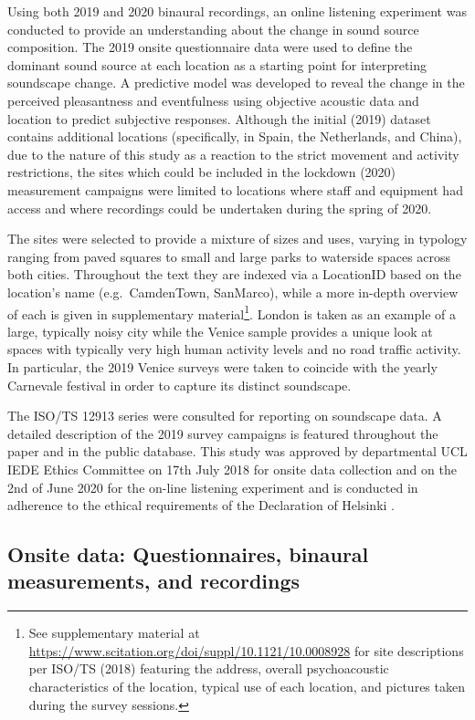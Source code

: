 \documentclass[
  authoryear,
  preprint,
  3p,
  onecolumn]{elsarticle}
\begin{document}
Using both 2019 and 2020 binaural recordings, an online listening
experiment was conducted to provide an understanding about the change in
sound source composition. The 2019 onsite questionnaire data were used
to define the dominant sound source at each location as a starting point
for interpreting soundscape change. A predictive model was developed to
reveal the change in the perceived pleasantness and eventfulness using
objective acoustic data and location to predict subjective responses.
Although the initial (2019) dataset contains additional locations
(specifically, in Spain, the Netherlands, and China), due to the nature
of this study as a reaction to the strict movement and activity
restrictions, the sites which could be included in the lockdown (2020)
measurement campaigns were limited to locations where staff and
equipment had access and where recordings could be undertaken during the
spring of 2020.

The sites were selected to provide a mixture of sizes and uses, varying
in typology ranging from paved squares to small and large parks to
waterside spaces across both cities. Throughout the text they are
indexed via a LocationID based on the location's name (e.g.~CamdenTown,
SanMarco), while a more in-depth overview of each is given in
supplementary material\footnote{See supplementary material at
  \url{https://www.scitation.org/doi/suppl/10.1121/10.0008928} for site
  descriptions per ISO/TS (2018) featuring the address, overall
  psychoacoustic characteristics of the location, typical use of each
  location, and pictures taken during the survey sessions.}. London is
taken as an example of a large, typically noisy city while the Venice
sample provides a unique look at spaces with typically very high human
activity levels and no road traffic activity. In particular, the 2019
Venice surveys were taken to coincide with the yearly Carnevale festival
in order to capture its distinct soundscape.

The ISO/TS 12913 \citep{ISO12913Part2} series were consulted for
reporting on soundscape data. A detailed description of the 2019 survey
campaigns is featured throughout the paper and in the public database.
This study was approved by departmental UCL IEDE Ethics Committee on
17th July 2018 for onsite data collection and on the 2nd of June 2020
for the on-line listening experiment and is conducted in adherence to
the ethical requirements of the Declaration of Helsinki
\citep{WMA2013World}.

\hypertarget{onsite-data-questionnaires-binaural-measurements-and-recordings}{%
\subsection{Onsite data: Questionnaires, binaural measurements, and
recordings}\label{onsite-data-questionnaires-binaural-measurements-and-recordings}}
\end{document}
